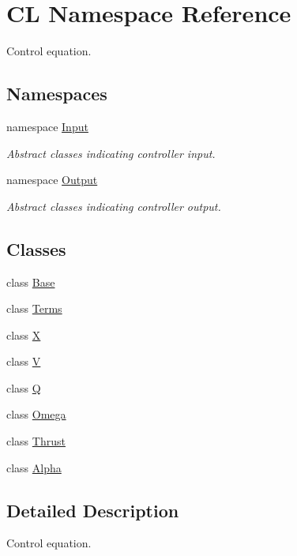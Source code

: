 \hypertarget{namespaceCL}{
\section{CL Namespace Reference}
\label{namespaceCL}
}


Control equation.  
\subsection*{Namespaces}
\begin{DoxyCompactItemize}
\item 
namespace \hyperlink{namespaceCL_1_1Input}{Input}


\begin{DoxyCompactList}\small\item\em Abstract classes indicating controller input. \item\end{DoxyCompactList}\item 
namespace \hyperlink{namespaceCL_1_1Output}{Output}


\begin{DoxyCompactList}\small\item\em Abstract classes indicating controller output. \item\end{DoxyCompactList}\end{DoxyCompactItemize}
\subsection*{Classes}
\begin{DoxyCompactItemize}
\item 
class \hyperlink{classCL_1_1Base}{Base}
\item 
class \hyperlink{classCL_1_1Terms}{Terms}
\item 
class \hyperlink{classCL_1_1X}{X}
\item 
class \hyperlink{classCL_1_1V}{V}
\item 
class \hyperlink{classCL_1_1Q}{Q}
\item 
class \hyperlink{classCL_1_1Omega}{Omega}
\item 
class \hyperlink{classCL_1_1Thrust}{Thrust}
\item 
class \hyperlink{classCL_1_1Alpha}{Alpha}
\end{DoxyCompactItemize}


\subsection{Detailed Description}
Control equation. 